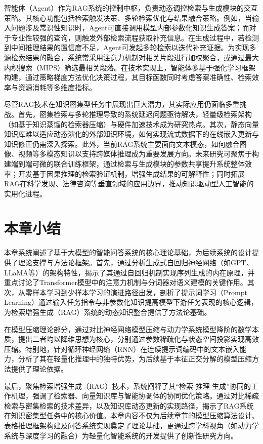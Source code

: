 智能体（Agent）作为RAG系统的控制中枢，负责动态调控检索与生成模块的交互策略。其核心功能包括检索触发决策、多轮检索优化与结果融合策略。例如，当输入问题涉及常识性知识时，Agent可直接调用模型内部参数化知识生成答案；而对于专业性较强的查询，则触发外部检索流程获取补充信息。在生成过程中，若检测到中间推理结果的置信度不足，Agent可发起多轮检索以迭代补充证据。为实现多源检索结果的融合，系统常采用注意力机制对相关片段进行加权聚合，或通过最大内积搜索（MIPS）筛选最相关段落。在技术实现上，智能体多基于强化学习框架构建，通过策略梯度方法优化决策过程，其目标函数同时考虑答案准确性、检索效率与资源消耗等多维度指标。

尽管RAG技术在知识密集型任务中展现出巨大潜力，其实际应用仍面临多重挑战。首先，密集检索与多轮推理导致的系统延迟问题亟待解决，轻量级检索架构（如基于知识蒸馏的检索器压缩）与硬件加速技术成为研究热点。其次，静态向量知识库难以适应动态演化的外部知识环境，如何实现流式数据下的在线嵌入更新与知识修正仍需深入探索。此外，当前RAG系统主要面向文本模态，如何融合图像、视频等多模态知识以支持跨媒体推理成为重要发展方向。未来研究可聚焦于构建端到端可微的联合训练框架，通过检索与生成模块的参数共享提升系统整体效率；开发基于因果推理的检索验证机制，增强生成结果的可解释性；同时拓展RAG在科学发现、法律咨询等垂直领域的应用边界，推动知识驱动型人工智能的实用化进程。
\section{本章小结}
本章系统阐述了基于大模型的智能问答系统的核心理论基础，为后续系统的设计提供了理论支撑与方法论框架。首先，通过分析生成式自回归神经网络（如GPT、LLaMA等）的架构特性，揭示了其通过自回归机制实现序列生成的内在原理，并重点讨论了Transformer模型中的注意力机制与分词器对语义建模的关键作用。其次，从零样本学习到少样本学习的演进路径出发，剖析了提示词学习（Prompt Learning）通过输入任务指令与非参数化知识提高模型下游任务表现的核心逻辑，为检索增强生成（RAG）系统的动态知识整合提供了方法论基础。

在模型压缩理论部分，通过对比神经网络模型压缩与动力学系统模型降阶的数学本质，提出二者均以降维思想为核心，分别通过参数稀疏化与状态空间投影实现高效压缩。特别地，针对循环神经网络（RNN）在连续提示词编码中的文本嵌入能力，分析了其在轻量化推理中的独特优势，为后续基于本征正交分解的模型压缩方法提供了理论依据。  

最后，聚焦检索增强生成（RAG）技术，系统阐释了其“检索-推理-生成”协同的工作机理，强调了检索器、向量知识库与智能协调体的协同优化策略。通过对比稀疏检索与密集检索的技术差异，以及知识库动态更新的实现路径，揭示了RAG系统在知识密集型任务中的核心价值。本章内容不仅为后续章节的模型压缩算法设计、表格推理框架构建及问答系统实现奠定了理论基础，更通过跨学科视角（如动力学系统与深度学习的融合）为轻量化智能系统的开发提供了创新性研究方向。


